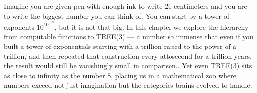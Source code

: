 Imagine you are given pen with enough ink to write 20 centimeters and you are to write the biggest number you can think of. You can start by a tower of exponents $10^{10^{\cdots^{10}}}$, but it is not that big. In this chapter we explore the hierarchy from computable functions to TREE(3) — a number so immense that even if you built a tower of exponentials starting with a trillion raised to the power of a trillion, and then repeated that construction every attosecond for a trillion years, the result would still be vanishingly small in comparison.. Yet even TREE(3) sits as close to infinity as the number 8, placing us in a mathematical zoo where numbers exceed not just imagination but the categories brains evolved to handle.